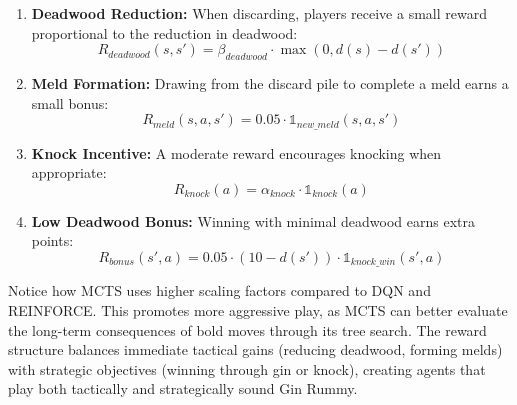 \begin{enumerate}
\item \textbf{Deadwood Reduction:} When discarding, players receive a small reward proportional to the reduction in deadwood:
\[
R_{deadwood}(s,s') = \beta_{deadwood} \cdot \max(0, d(s) - d(s'))
\]

\item \textbf{Meld Formation:} Drawing from the discard pile to complete a meld earns a small bonus:
\[
R_{meld}(s,a,s') = 0.05 \cdot \mathbb{1}_{new\_meld}(s,a,s')
\]

\item \textbf{Knock Incentive:} A moderate reward encourages knocking when appropriate:
\[
R_{knock}(a) = \alpha_{knock} \cdot \mathbb{1}_{knock}(a)
\]

\item \textbf{Low Deadwood Bonus:} Winning with minimal deadwood earns extra points:
\[
R_{bonus}(s',a) = 0.05 \cdot (10 - d(s')) \cdot \mathbb{1}_{knock\_win}(s',a)
\]
\end{enumerate}

Notice how MCTS uses higher scaling factors compared to DQN and REINFORCE. This promotes more aggressive play, as MCTS can better evaluate the long-term consequences of bold moves through its tree search. The reward structure balances immediate tactical gains (reducing deadwood, forming melds) with strategic objectives (winning through gin or knock), creating agents that play both tactically and strategically sound Gin Rummy. 